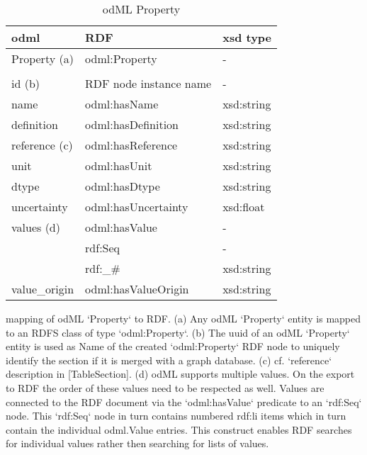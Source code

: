 \documentclass{article}
\begin{document}
\begin{table}
\begin{threeparttable}
\caption{odML Property}
\begin{tabular}{l|l|l}
    odml            & RDF                             & xsd type \\
\hline
    Property (a)    & odml:Property                   & - \\
                    & & \\
    id (b)          & RDF node instance name          & - \\
    name            & odml:hasName                    & xsd:string \\
    definition      & odml:hasDefinition              & xsd:string \\
    reference (c)   & odml:hasReference               & xsd:string \\
    unit            & odml:hasUnit                    & xsd:string \\
    dtype           & odml:hasDtype                   & xsd:string \\
    uncertainty     & odml:hasUncertainty             & xsd:float \\
    values (d)      & odml:hasValue                   & - \\
                    & rdf:Seq                         & - \\
                    & rdf:_#                          & xsd:string \\
    value_origin    & odml:hasValueOrigin             & xsd:string \\
\end{tabular}
\begin{tablenotes}
\item mapping of odML `Property` to RDF. (a) Any odML `Property` entity is mapped to an RDFS class of type `odml:Property`. (b) The uuid of an odML `Property` entity is used as Name of the created `odml:Property` RDF node to uniquely identify the section if it is
merged with a graph database. (c) cf. `reference` description in [TableSection]. (d) odML supports multiple values. On the export to RDF the order of these values need to be respected as well. Values are connected to the RDF document via the `odml:hasValue` predicate to an `rdf:Seq` node. This `rdf:Seq` node in turn contains numbered rdf:li items which in turn contain the individual odml.Value entries. This construct enables RDF searches for individual values rather then searching for lists of values.
\end{tablenotes}
\end{threeparttable}
\end{table}
\end{document}

